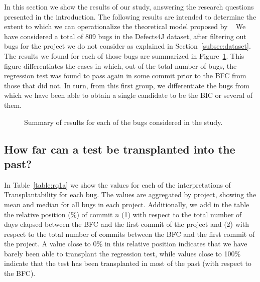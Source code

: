 In this section we show the results of our study, answering the research questions presented in the introduction. 
The following results are intended to determine the extent to which we can operationalize the theoretical model proposed by \gema~
We have considered a total of 809 bugs in the Defects4J dataset, after filtering out bugs for the project we do not consider as explained in Section~\ref{subsec:dataset}. The results we found for each of those bugs are summarized in Figure~\ref{fig:experiment-overview}. 
This figure differentiates the cases in which, out of the total number of bugs, the regression test was found to pass again in some commit prior to the BFC from those that did not. In turn, from this first group, we differentiate the bugs from which we have been able to obtain a single candidate to be the BIC or several of them.

\begin{figure}[h!]
    \centering    
    
    \caption{Summary of results for each of the bugs considered in the study.}
    \label{fig:experiment-overview}
\end{figure}


\subsection{How far can a test be transplanted into the past?}
\label{results:rq1a}

In Table~\ref{table:rq1a} we show the values for each of the interpretations of Transplantability for each bug. 
The values are aggregated by project, showing the mean and median for all bugs in each project. 
Additionally, we add in the table the relative position (\%) of commit $n$ (1) with respect to the total number of days elapsed between the BFC and the first commit of the project and (2) with respect to the total number of commits between the BFC and the first commit of the project. 
A value close to 0\% in this relative position indicates that we have barely been able to transplant the regression test, while values close to 100\% indicate that the test has been transplanted in most of the past (with respect to the BFC).

